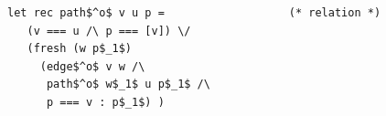 \begin{lstlisting}[language=ocanren]
 let rec path$^o$ v u p =                   (* relation *)
   (v === u /\ p === [v]) \/
   (fresh (w p$_1$)
     (edge$^o$ v w /\
      path$^o$ w$_1$ u p$_1$ /\
      p === v : p$_1$) )
\end{lstlisting}